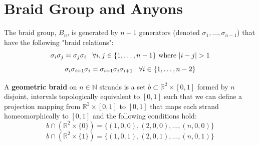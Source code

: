 \documentclass[compress,aspectratio=169,10pt,usenames,dvipsnames]{beamer}
\newcommand{\R}{\mathbb{R}}
\newcommand{\N}{\mathbb{N}}
\begin{document}

\section{Braid Group and Anyons}
\begin{frame}
\sectionpage
\end{frame}
%
%
\begin{frame}
\vfill
\begin{definition}
	The braid group, $B_n$, is generated by $n-1$ generators (denoted $\sigma_1,\hdots,\sigma_{n-1}$) that have the following "braid relations":
$$\sigma_i\sigma_j = \sigma_j\sigma_i \hspace{3mm} \forall i,j \in \{1,\hdots,n-1\} \text{ where } |i-j|>1$$
$$\sigma_i\sigma_{i+1}\sigma_i=\sigma_{i+1}\sigma_i\sigma_{i+1} \hspace{3mm} \forall i \in \{1,\hdots,n-2\}$$
\end{definition}
\vfill
\begin{definition}
	A \textbf{geometric braid} on $n\in \N$ strands is a set $b\subset\R^2\times [0,1]$ formed by $n$ disjoint, intervals topologically equivalent to $[0,1]$ such that we can define a projection mapping from $\R^2\times [0,1]$ to $[0,1]$ that maps each strand homeomorphically to $[0,1]$ and the following conditions hold:
$$b\cap(\R^2\times\{0\}) = \{(1,0,0),(2,0,0),\hdots,(n,0,0)\}$$
$$b\cap(\R^2\times\{1\}) = \{(1,0,1),(2,0,1),\hdots,(n,0,1)\}$$
\end{definition}
\vfill
\end{frame}
\end{document}
